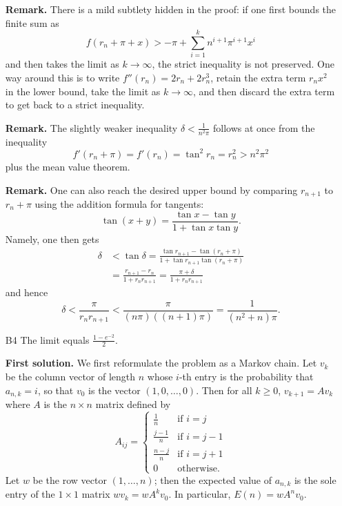 \documentclass[amssymb,twocolumn,pra,10pt,aps]{revtex4-1}
\begin{document}
\begin{itemize}
\noindent
\textbf{Remark.}
There is a mild subtlety hidden in the proof:
if one first bounds the finite sum as
\[
f(r_n+\pi+x) > -\pi+ \sum_{i=1}^k n^{i+1} \pi^{i+1} x^i
\]
and then takes the limit as $k \to \infty$, the strict inequality is not preserved. One way around this is to write $f''(r_n) = 2r_n + 2 r_n^3$,
retain the extra term $r_n x^2$ in the lower bound, take the limit as $k \to \infty$, and then discard the extra term to get back to a strict inequality. 

\noindent
\textbf{Remark.}
The slightly weaker inequality $\delta < \frac{1}{n^2 \pi}$
follows at once from the inequality
\[
f'(r_n + \pi) = f'(r_n) = \tan^2 r_n = r_n^2 > n^2 \pi^2
\]
plus the mean value theorem.

\noindent
\textbf{Remark.}
One can also reach the desired upper bound by comparing $r_{n+1}$ to $r_n + \pi$ using the addition formula for tangents:
\[
\tan(x+y) = \frac{\tan x - \tan y}{1 + \tan x \tan y}.
\]
Namely, one then gets
\begin{align*}
\delta &< \tan \delta = \frac{\tan r_{n+1}  - \tan (r_n+\pi)}{1 + \tan r_{n+1} \tan (r_n+\pi)} \\
&= \frac{r_{n+1}-r_n}{1 + r_n r_{n+1}} = \frac{\pi + \delta}{1 + r_n r_{n+1}}
\end{align*}
and hence
\[
\delta < \frac{\pi}{r_n r_{n+1}} < \frac{\pi}{(n\pi)((n+1)\pi)} = \frac{1}{(n^2+n)\pi}.
\]


\item[B4]
The limit equals $\frac{1-e^{-2}}{2}$.

\noindent
\textbf{First solution.}
We first reformulate the problem as a Markov chain.
Let $v_k$ be the column vector of length $n$ whose $i$-th entry is the probability that $a_{n,k} = i$, so that $v_0$ is the vector $(1,0,\dots,0)$.
Then for all $k \geq 0$, $v_{k+1} = A v_k$ where $A$ is the $n \times n$
matrix defined by
\[
A_{ij} = \begin{cases}
\frac{1}{n} & \mbox{if $i = j$} \\
\frac{j-1}{n} & \mbox{if $i = j-1$} \\
\frac{n-j}{n} & \mbox{if $i = j+1$} \\
0 & \mbox{otherwise.}
\end{cases}
\]
Let $w$ be the row vector $(1, \dots, n)$; then the expected value of $a_{n,k}$ is the sole entry of the $1 \times 1$ matrix $w v_k = w A^k v_0$. In particular, $E(n) = w A^n v_0$.


\end{itemize}
\end{document}
